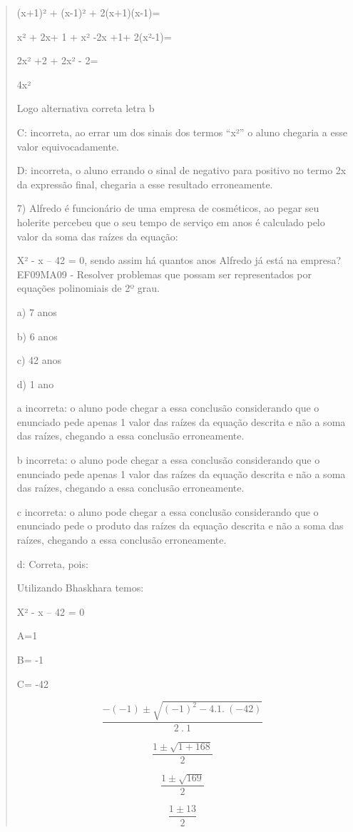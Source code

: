 \begin{quote}
\begin{escolha}
(x+1)² + (x-1)² + 2(x+1)(x-1)=

x² + 2x+ 1 + x² -2x +1+ 2(x²-1)=

2x² +2 + 2x² - 2=

4x²

Logo alternativa correta letra b

C: incorreta, ao errar um dos sinais dos termos ``x²'' o aluno chegaria
a esse valor equivocadamente.

D: incorreta, o aluno errando o sinal de negativo para positivo no termo
2x da expressão final, chegaria a esse resultado erroneamente.

7) Alfredo é funcionário de uma empresa de cosméticos, ao pegar seu
holerite percebeu que o seu tempo de serviço em anos é calculado pelo
valor da soma das raízes da equação:

X² - x -- 42 = 0, sendo assim há quantos anos Alfredo já está na
empresa? EF09MA09 - Resolver problemas que possam ser representados por
equações polinomiais de 2º grau.

a) 7 anos

b) 6 anos

c) 42 anos

d) 1 ano

a incorreta: o aluno pode chegar a essa conclusão considerando que o
enunciado pede apenas 1 valor das raízes da equação descrita e não a
soma das raízes, chegando a essa conclusão erroneamente.

b incorreta: o aluno pode chegar a essa conclusão considerando que o
enunciado pede apenas 1 valor das raízes da equação descrita e não a
soma das raízes, chegando a essa conclusão erroneamente.

c incorreta: o aluno pode chegar a essa conclusão considerando que o
enunciado pede o produto das raízes da equação descrita e não a soma das
raízes, chegando a essa conclusão erroneamente.

d: Correta, pois:

Utilizando Bhaskhara temos:

X² - x -- 42 = 0

A=1

B= -1

C= -42

\[\frac{- ( - 1) \pm \sqrt{{( - 1)}^{2} - 4.1.\ ( - 42)}}{2\ .\ 1}\]

\[\frac{1 \pm \sqrt{1 + 168}}{2}\]

\[\frac{1 \pm \sqrt{169}}{2}\]

\[\frac{1 \pm 13}{2}\]


\end{escolha}
\end{quote}

